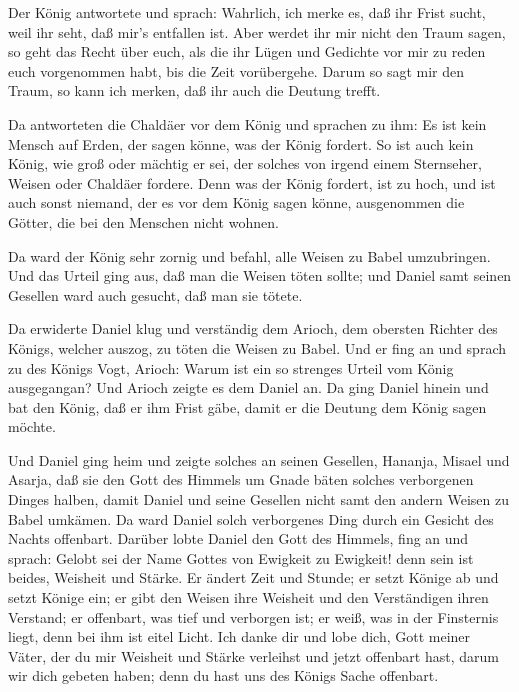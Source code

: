  Der König antwortete und sprach: Wahrlich, ich merke es,
daß ihr Frist sucht, weil ihr seht, daß mir's entfallen ist.
 Aber werdet ihr mir nicht den Traum sagen, so geht das
Recht über euch, als die ihr Lügen und Gedichte vor mir zu reden euch
vorgenommen habt, bis die Zeit vorübergehe. Darum so sagt mir den Traum,
so kann ich merken, daß ihr auch die Deutung trefft.

 Da antworteten die Chaldäer vor dem König und sprachen zu
ihm: Es ist kein Mensch auf Erden, der sagen könne, was der König
fordert. So ist auch kein König, wie groß oder mächtig er sei, der
solches von irgend einem Sternseher, Weisen oder Chaldäer fordere.
 Denn was der König fordert, ist zu hoch, und ist auch
sonst niemand, der es vor dem König sagen könne, ausgenommen die Götter,
die bei den Menschen nicht wohnen.

 Da ward der König sehr zornig und befahl, alle Weisen zu
Babel umzubringen.  Und das Urteil ging aus, daß man die
Weisen töten sollte; und Daniel samt seinen Gesellen ward auch gesucht,
daß man sie tötete.

 Da erwiderte Daniel klug und verständig dem Arioch, dem
obersten Richter des Königs, welcher auszog, zu töten die Weisen zu
Babel.  Und er fing an und sprach zu des Königs Vogt,
Arioch: Warum ist ein so strenges Urteil vom König ausgegangan? Und
Arioch zeigte es dem Daniel an.  Da ging Daniel hinein und
bat den König, daß er ihm Frist gäbe, damit er die Deutung dem König
sagen möchte.

 Und Daniel ging heim und zeigte solches an seinen
Gesellen, Hananja, Misael und Asarja,  daß sie den Gott des
Himmels um Gnade bäten solches verborgenen Dinges halben, damit Daniel
und seine Gesellen nicht samt den andern Weisen zu Babel umkämen.
 Da ward Daniel solch verborgenes Ding durch ein Gesicht
des Nachts offenbart.  Darüber lobte Daniel den Gott des
Himmels, fing an und sprach: Gelobt sei der Name Gottes von Ewigkeit zu
Ewigkeit! denn sein ist beides, Weisheit und Stärke.  Er
ändert Zeit und Stunde; er setzt Könige ab und setzt Könige ein; er gibt
den Weisen ihre Weisheit und den Verständigen ihren Verstand;
 er offenbart, was tief und verborgen ist; er weiß, was in
der Finsternis liegt, denn bei ihm ist eitel Licht.  Ich
danke dir und lobe dich, Gott meiner Väter, der du mir Weisheit und
Stärke verleihst und jetzt offenbart hast, darum wir dich gebeten haben;
denn du hast uns des Königs Sache offenbart.

